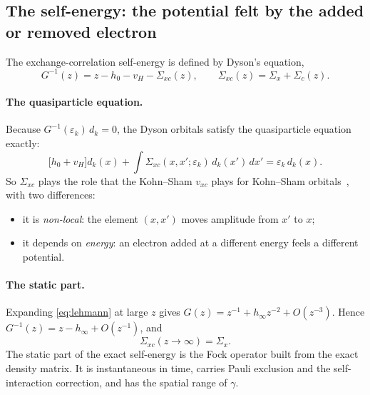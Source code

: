 \documentclass[11pt,a4paper]{article}
\begin{document}
\subsection{The self-energy: the potential felt by the added or removed electron}

The exchange-correlation self-energy is defined by Dyson's equation,
\begin{equation}
G^{-1}(z) = z - h_0 - v_H - \Sigma_{xc}(z), \qquad \Sigma_{xc}(z) = \Sigma_x + \Sigma_c(z).
\label{eq:dyson}
\end{equation}

\paragraph{The quasiparticle equation.} Because $G^{-1}(\varepsilon_k)\,d_k = 0$, the Dyson orbitals satisfy the quasiparticle equation exactly:
\begin{equation}
\big[h_0 + v_H\big]d_k(x) + \int\Sigma_{xc}(x,x';\varepsilon_k)\,d_k(x')\,dx' = \varepsilon_k\,d_k(x).
\label{eq:qp}
\end{equation}
So $\Sigma_{xc}$ plays the role that the Kohn--Sham $v_{xc}$ plays for Kohn--Sham orbitals~\cite{godby1988}, with two differences:
\begin{itemize}
\item it is \emph{non-local}: the element $(x,x')$ moves amplitude from $x'$ to $x$;
\item it depends on \emph{energy}: an electron added at a different energy feels a different potential.
\end{itemize}

\paragraph{The static part.} Expanding \cref{eq:lehmann} at large $z$ gives $G(z) = z^{-1} + h_\infty z^{-2} + O(z^{-3})$. Hence $G^{-1}(z) = z - h_\infty + O(z^{-1})$, and
\begin{equation}
\Sigma_{xc}(z\to\infty) = \Sigma_x .
\end{equation}
The static part of the exact self-energy is the Fock operator built from the exact density matrix. It is instantaneous in time, carries Pauli exclusion and the self-interaction correction, and has the spatial range of $\gamma$.
\end{document}
